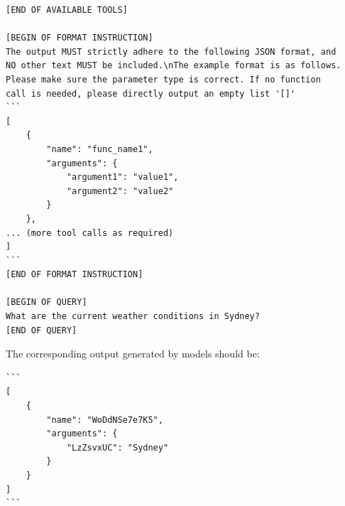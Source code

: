 \documentclass{article}
\begin{document}
\begin{verbatim}
[END OF AVAILABLE TOOLS]

[BEGIN OF FORMAT INSTRUCTION]
The output MUST strictly adhere to the following JSON format, and 
NO other text MUST be included.\nThe example format is as follows. 
Please make sure the parameter type is correct. If no function 
call is needed, please directly output an empty list '[]'
```
[
    {
        "name": "func_name1", 
        "arguments": {
            "argument1": "value1", 
            "argument2": "value2"
        }
    },
... (more tool calls as required)
]
```
[END OF FORMAT INSTRUCTION]

[BEGIN OF QUERY]
What are the current weather conditions in Sydney?
[END OF QUERY]
\end{verbatim}

The corresponding output generated by models should be:

\begin{verbatim}
```
[
    {
        "name": "WoDdNSe7e7K5", 
        "arguments": {
            "LzZsvxUC": "Sydney"
        }
    }
]
```
\end{verbatim}


% 
% 

% 
\end{document}
